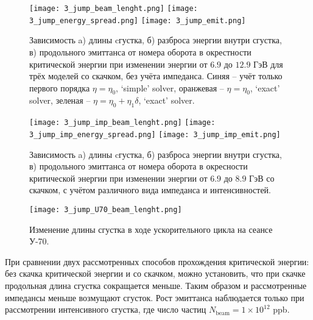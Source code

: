 \begin{figure}
   \texttt{[image: 3\_jump\_beam\_lenght.png]}
   \texttt{[image: 3\_jump\_energy\_spread.png]}
   \texttt{[image: 3\_jump\_emit.png]}
   \caption{Зависимость a) длины cгустка, б) разброса энергии внутри сгустка, в) продольного эмиттанса от номера оборота в окрестности критической энергии при изменении энергии от $6.9$ до $12.9$ ГэВ для трёх моделей со скачком, без учёта импеданса. Синяя – учёт только первого порядка $\eta=\eta_0$, ‘simple’ solver, оранжевая – $\eta=\eta_0$, ‘exact’ solver, зеленая – $\eta=\eta_0+\eta_1\delta$, ‘exact’ solver.}
   \label{fig:3_jump}
\end{figure}

\begin{figure}
   \texttt{[image: 3\_jump\_imp\_beam\_lenght.png]}
   \texttt{[image: 3\_jump\_imp\_energy\_spread.png]}
   \texttt{[image: 3\_jump\_imp\_emit.png]}
   \caption{Зависимость a) длины cгустка, б) разброса энергии внутри сгустка, в) продольного эмиттанса от номера оборота в окресности критической энергии при изменении энергии от $6.9$ до $8.9$ ГэВ со скачком, с учётом различного вида импеданса и интенсивностей.}
   \label{fig:3_jump_imp}
\end{figure}

\begin{figure}
   \centering
   \texttt{[image: 3\_jump\_U70\_beam\_lenght.png]}
   \caption{Изменение длины сгустка в ходе ускорительного цикла на сеансе У-70.}
   \label{fig:3_jump_U70_beam_lenght}
\end{figure}

\par При сравнении двух рассмотренных способов прохождения критической энергии: без скачка критической энергии и со скачком, можно установить, что при скачке продольная длина сгустка сокращается меньше. Таким образом и рассмотренные импедансы меньше возмущают сгусток. Рост эмиттанса наблюдается только при рассмотрении интенсивного сгустка, где число частиц $N_{\textrm{beam}}=1\times{10}^{12}$ ppb.


